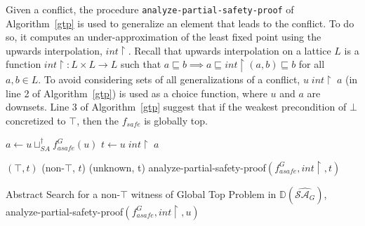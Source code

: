 %
Given a conflict, the procedure \texttt{analyze-partial-safety-proof} of Algorithm~\ref{gtp} is used to generalize 
an element that leads to the conflict.  To do so, it computes an 
under-approximation of the least fixed point using the upwards interpolation, 
$int \upharpoonright$.  Recall that upwards interpolation on a lattice $L$ 
is a function $int \upharpoonright \colon L \times L \rightarrow L$ such 
that $a \sqsubseteq b \implies a \sqsubseteq int \upharpoonright(a,b) \sqsubseteq b$ for all $a,b \in L$. 
To avoid considering sets of all generalizations of a conflict, $u \;int \upharpoonright \; a$ 
(in line 2 of Algorithm~\ref{gtp}) is used as a choice function, where $u$ and $a$ are downsets. 
Line 3 of Algorithm~\ref{gtp} suggest that if the weakest precondition of $\bot$ concretized to $\top$, 
then the $f_{safe}$ is globally top.


%
\begin{algorithm2e}[t]
\DontPrintSemicolon
{}
\begin{small}

	$a \leftarrow u \sqcup_{SA}^\dagger f_{asafe}^G(u)$ \;
	$t \leftarrow u\; int \upharpoonright \; a$ \;
	
	 {\return $(\top,t)$} 
         {\return (non-$\top$, $t$)} 
	 {\return (unknown, t)}
	{\return analyze-partial-safety-proof$(f_{asafe}^G, int \upharpoonright,t)$}
\end{small}
	\caption{Abstract Search for a non-$\top$ witness of Global Top Problem in $\mathbb{D}(\widehat{\mathcal{SA}_G})$,  
	analyze-partial-safety-proof$(f_{asafe}^G,int \upharpoonright,u)$ \label{gtp}}
\end{algorithm2e}
%

